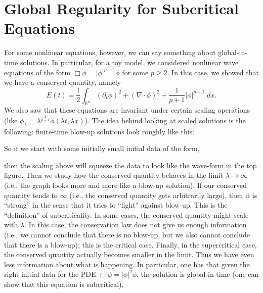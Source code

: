 \documentclass{article}
\begin{document}
	\section{Global Regularity for Subcritical Equations} 
	For some nonlinear equations, however, we can say something about global-in-time solutions. In particular, for a toy model, we considered nonlinear wave equations of the form $\Box\phi = |\phi|^{p - 1}\phi$ for some $p \geq 2$. In this case, we showed that we have a conserved quantity, namely 
	\begin{equation*}
		E(t) =\frac{1}{2}\int_{\mathbb{R}^{n}}(\partial_{t}\phi)^{2} + (\nabla \cdot \phi)^{2} + \frac{1}{p + 1}|\phi|^{p + 1}\;dx. 
	\end{equation*} 
	We also saw that these equations are invariant under certain scaling operations (like $\phi_{\lambda} = \lambda^{\frac{2}{p - 1}}\phi(\lambda t, \lambda x)$). The idea behind looking at scaled solutions is the following: finite-time blow-up solutions look roughly like this: 
	\begin{figure}[h!]
		\centering 
	\end{figure}
	
	So if we start with some initially small initial data of the form, 
	\begin{figure}[h!]
		\centering 
	\end{figure}
	
	then the scaling above will squeeze the data to look like the wave-form in the top figure. Then we study how the conserved quantity behaves in the limit $\lambda \to \infty$ (i.e., the graph looks more and more like a blow-up solution). If our conserved quantity tends to $\infty$ (i.e., the conserved quantity gets arbitrarily large), then it is ``strong'' in the sense that it tries to ``fight'' against blow-up. This is the ``definition'' of subcriticality. In some cases, the conserved quantity might scale with $\lambda$. In this case, the conservation law does not give us enough information (i.e., we cannot conclude that there is no blow-up, but we also cannot conclude that there is a blow-up); this is the critical case. Finally, in the supercritical case, the conserved quantity actually becomes smaller in the limit. Thus we have even less information about what is happening. In particular, one has that given the right initial data for the PDE $\Box\phi = |\phi|^{2}\phi$, the solution is global-in-time (one can show that this equation is subcritical). 
	
\end{document}
